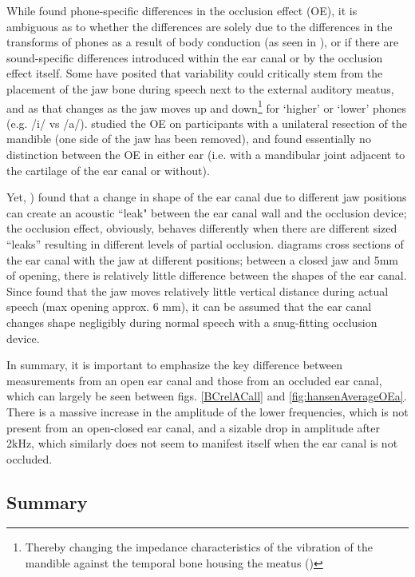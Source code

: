 \documentclass[dissertation,copyright]{uathesis}
\begin{document}
While \cite{hansen:97b} found phone-specific differences in the occlusion effect (OE), it is ambiguous as to whether the differences are solely due to the differences in the transforms of phones as a result of body conduction (as seen in \cite{reinfeldt:10}), or if there are sound-specific differences introduced within the ear canal or by the occlusion effect itself.  
Some have posited that variability could critically stem from the placement of the jaw bone during speech next to the external auditory meatus, and as that changes as the jaw moves up and down\footnote{Thereby changing the impedance characteristics of the vibration of the mandible against the temporal bone housing the meatus (\cite{bekesy:60})} for `higher' or `lower' phones (e.g. /i/ vs /a/).  \cite{allen:60} studied the OE on participants with a unilateral resection of the mandible (one side of the jaw has been removed), and found essentially no distinction between the OE in either ear (i.e. with a mandibular joint adjacent to the cartilage of the ear canal or without).

Yet, \cite{hansen:97b}) found that a change in shape of the ear canal due to different jaw positions can create an acoustic ``leak" between the ear canal wall and the occlusion device; the occlusion effect, obviously, behaves differently when there are different sized ``leaks'' resulting in different levels of partial occlusion. 
\cite{hansen:97b} diagrams cross sections of the ear canal with the jaw at different positions; between a closed jaw and 5mm of opening, there is relatively little difference between the shapes of the ear canal.  Since \cite{borghese:97} found that the jaw moves relatively little vertical distance during actual speech (max opening approx. 6 mm), it can be assumed that the ear canal changes shape negligibly during normal speech with a snug-fitting occlusion device. 

In summary, it is important to emphasize the key difference between measurements from an open ear canal and those from an occluded ear canal, which can largely be seen between figs. \ref{BCrelACall} and \ref{fig:hansenAverageOEa}.  There is a massive increase in the amplitude of the lower frequencies, which is not present from an open-closed ear canal, and a sizable drop in amplitude after 2kHz, which similarly does not seem to manifest itself when the ear canal is not occluded.


\subsection{Summary}
\end{document}
